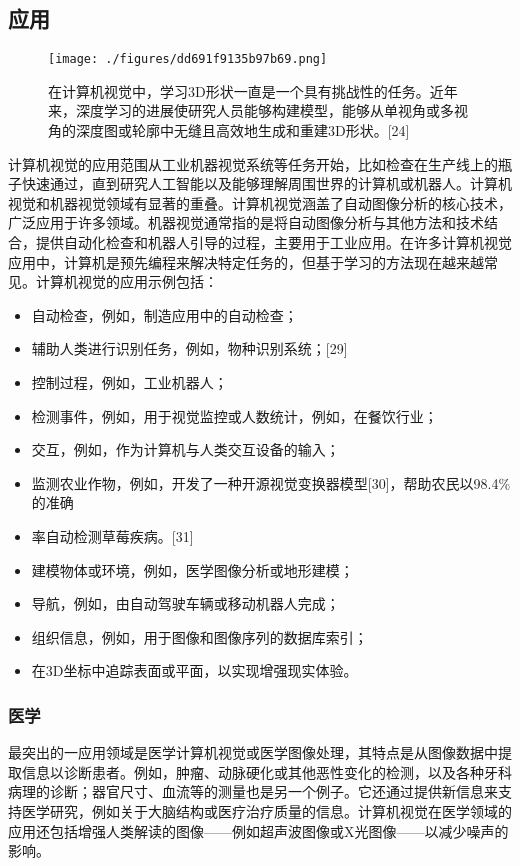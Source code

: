 \subsection{应用}  
\begin{figure}[ht]
\centering
\texttt{[image: ./figures/dd691f9135b97b69.png]}
\caption{在计算机视觉中，学习3D形状一直是一个具有挑战性的任务。近年来，深度学习的进展使研究人员能够构建模型，能够从单视角或多视角的深度图或轮廓中无缝且高效地生成和重建3D形状。[24]} \label{fig_JSJ_4}
\end{figure}
计算机视觉的应用范围从工业机器视觉系统等任务开始，比如检查在生产线上的瓶子快速通过，直到研究人工智能以及能够理解周围世界的计算机或机器人。计算机视觉和机器视觉领域有显著的重叠。计算机视觉涵盖了自动图像分析的核心技术，广泛应用于许多领域。机器视觉通常指的是将自动图像分析与其他方法和技术结合，提供自动化检查和机器人引导的过程，主要用于工业应用。在许多计算机视觉应用中，计算机是预先编程来解决特定任务的，但基于学习的方法现在越来越常见。计算机视觉的应用示例包括：
\begin{itemize}
\item 自动检查，例如，制造应用中的自动检查；  
\item 辅助人类进行识别任务，例如，物种识别系统；[29]  
\item 控制过程，例如，工业机器人；  
\item 检测事件，例如，用于视觉监控或人数统计，例如，在餐饮行业；  
\item 交互，例如，作为计算机与人类交互设备的输入；  
\item 监测农业作物，例如，开发了一种开源视觉变换器模型[30]，帮助农民以98.4\%的准确\item 率自动检测草莓疾病。[31]  
\item 建模物体或环境，例如，医学图像分析或地形建模；  
\item 导航，例如，由自动驾驶车辆或移动机器人完成；  
\item 组织信息，例如，用于图像和图像序列的数据库索引；  
\item 在3D坐标中追踪表面或平面，以实现增强现实体验。
\end{itemize}
\subsubsection{医学}
最突出的一应用领域是医学计算机视觉或医学图像处理，其特点是从图像数据中提取信息以诊断患者。例如，肿瘤、动脉硬化或其他恶性变化的检测，以及各种牙科病理的诊断；器官尺寸、血流等的测量也是另一个例子。它还通过提供新信息来支持医学研究，例如关于大脑结构或医疗治疗质量的信息。计算机视觉在医学领域的应用还包括增强人类解读的图像——例如超声波图像或X光图像——以减少噪声的影响。
